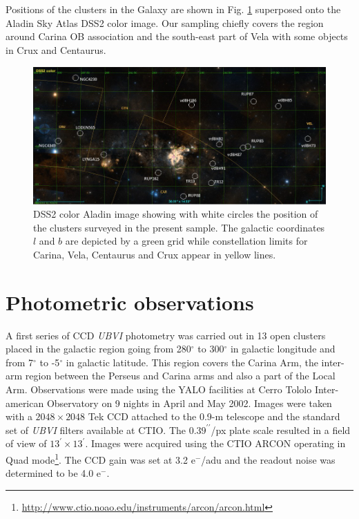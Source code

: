\documentclass[draft]{aa}
\begin{document}
Positions of the clusters in the Galaxy are shown in Fig. \ref{fig1} superposed
onto the Aladin Sky Atlas DSS2 color image. Our sampling chiefly covers the
region around Carina OB association and the south-east part of Vela with some
objects in Crux and Centaurus.

\begin{figure}[ht]
    \centering
    \includegraphics[width=\hsize]{../figs/DSS2color.png}
    \caption{DSS2 color Aladin image showing with white circles the position of
    the clusters surveyed in the present sample. The galactic coordinates $l$
    and $b$ are depicted by a green grid while constellation limits for Carina,
    Vela, Centaurus and Crux appear in yellow lines.}
    \label{fig1}
\end{figure}




\section{Photometric observations}
\label{sec:photo_obs}

A first series of CCD \emph{UBVI} photometry was carried out in 13 open clusters
placed in the galactic region going from 280$^\circ$ to 300$^\circ$ in galactic
longitude and from 7$^\circ$ to -5$^\circ$ in galactic latitude. This region
covers the Carina Arm, the inter-arm region between the Perseus and Carina arms
and also a part of the Local Arm.
Observations were made using the YALO facilities at Cerro Tololo Inter-american
Observatory on 9 nights in April and May 2002. Images were taken with a
$2048\times2048$ Tek CCD attached to the 0.9-m telescope and the standard set of
\textit{UBVI} filters available at CTIO. The $0.39^{\prime\prime}$/px plate scale
resulted in a field of view of $13^\prime\times13^\prime$. Images were acquired
using the CTIO ARCON operating in Quad
mode\footnote{\url{http://www.ctio.noao.edu/instruments/arcon/arcon.html}}. The
CCD gain was set at 3.2 e$^-$/adu and the readout noise was determined to be
4.0 e$^-$.
\end{document}
